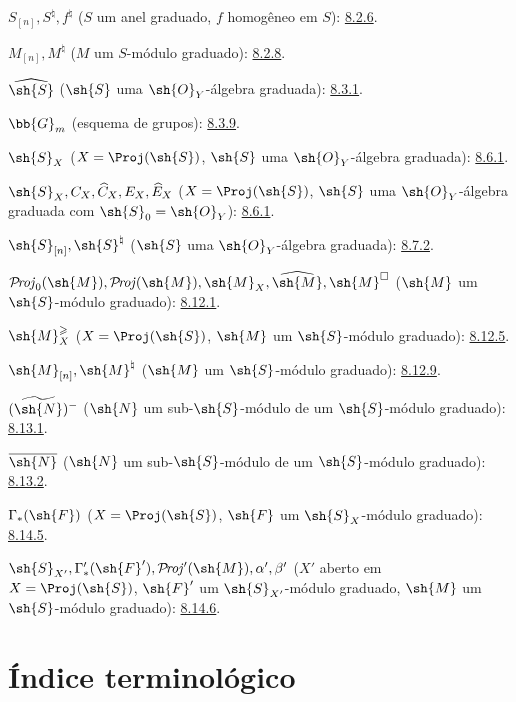 \documentclass[oneside,10pt]{amsart}
\renewcommand{\geq}{\geqslant}
\def\shProj{\mathcal{P}\!\mathit{roj}}
\newcommand{\oldpage}[2][]{\marginnote{\normalfont\footnotesize\textbf{#1}~|~#2}\ignorespaces}
\begin{document}
$S_{[n]},S^\natural,f^\natural$
($S$ um anel graduado, $f$ homogêneo em $S$): \hyperref[II.8.2.6]{8.2.6}.

$M_{[n]},M^\natural$ ($M$ um $S$-módulo graduado): \hyperref[II.8.2.8]{8.2.8}.

$\widehat{\sh{S}}$ ($\sh{S}$ uma $\sh{O}_Y$-álgebra graduada): \hyperref[II.8.3.1]{8.3.1}.

$\bb{G}_m$ (esquema de grupos): \hyperref[II.8.3.9]{8.3.9}.

$\sh{S}_X$ ($X=\Proj(\sh{S})$, $\sh{S}$ uma $\sh{O}_Y$-álgebra graduada): \hyperref[II.8.6.1]{8.6.1}.

$\sh{S}_X,C_X,\widehat C_X,E_X,\widehat E_X$
($X=\Proj(\sh{S})$, $\sh{S}$ uma $\sh{O}_Y$-álgebra graduada
com $\sh{S}_0=\sh{O}_Y$): \hyperref[II.8.6.1]{8.6.1}.

$\sh{S}_{[n]},\sh{S}^{\natural}$
($\sh{S}$ uma $\sh{O}_Y$-álgebra graduada): \hyperref[II.8.7.2]{8.7.2}.

$\shProj_0(\sh{M}),\shProj(\sh{M}),\sh{M}_X,
\widehat{\sh{M}},\sh{M}^{\square}$
($\sh{M}$ um $\sh{S}$-módulo graduado): \hyperref[II.8.12.1]{8.12.1}.

$\sh{M}_X^\geq$
($X=\Proj(\sh{S})$, $\sh{M}$ um $\sh{S}$-módulo graduado): \hyperref[II.8.12.5]{8.12.5}.

$\sh{M}_{[n]},\sh{M}^{\natural}$
($\sh{M}$ um $\sh{S}$-módulo graduado): \hyperref[II.8.12.9]{8.12.9}.

$(\widetilde{\sh{N}})^-$
($\sh{N}$ um sub-$\sh{S}$-módulo de um $\sh{S}$-módulo graduado): \hyperref[II.8.13.1]{8.13.1}.

$\overline{\sh{N}}$
($\sh{N}$ um sub-$\sh{S}$-módulo de um $\sh{S}$-módulo graduado): \hyperref[II.8.13.2]{8.13.2}.

$\Gamma_*(\sh{F})$
($X=\Proj(\sh{S})$, $\sh{F}$ um $\sh{S}_X$-módulo graduado): \hyperref[II.8.14.5]{8.14.5}.

$\sh{S}_{X'},\Gamma'_*(\sh{F}'),\shProj'(\sh{M}),
\alpha',\beta'$
($X'$ aberto em $X=\Proj(\sh{S})$, $\sh{F}'$ um $\sh{S}_{X'}$-módulo graduado,
$\sh{M}$ um $\sh{S}$-módulo graduado): \hyperref[II.8.14.6]{8.14.6}.

\endgroup

\clearpage
\oldpage[II]{209}
{}
\section*{Índice terminológico}

\begingroup
\small
\setlength{\parindent}{0pt}
\setlength{\parskip}{2pt}
\newcommand{\egaTerm}[2]{\textbf{#1}: #2.\par}
\end{document}

